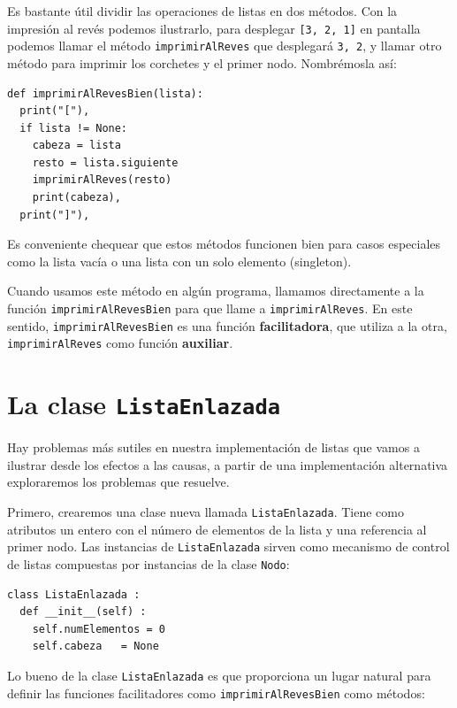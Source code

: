   
  

Es bastante útil dividir las operaciones de listas en dos métodos.
Con la impresión al revés podemos ilustrarlo, para desplegar \texttt{{[}3,
2, 1{]}} en pantalla podemos llamar el método \texttt{imprimirAlReves}
que desplegará \texttt{3, 2}, y llamar otro método para imprimir los
corchetes y el primer nodo. Nombrémosla así:

\beforeverb 
\begin{verbatim}
def imprimirAlRevesBien(lista):
  print("["),
  if lista != None:
    cabeza = lista
    resto = lista.siguiente
    imprimirAlReves(resto)
    print(cabeza),
  print("]"),
\end{verbatim}
\afterverb Es conveniente chequear que estos métodos funcionen bien
para casos especiales como la lista vacía o una lista con un solo
elemento (singleton).


Cuando usamos este método en algún programa, llamamos directamente
a la función \texttt{imprimirAlRevesBien} para que llame a \texttt{imprimirAlReves}.
En este sentido, \texttt{imprimirAlRevesBien} es una función \textbf{facilitadora},
que utiliza a la otra, \texttt{imprimirAlReves} como función \textbf{auxiliar}.

\section{La clase \texttt{ListaEnlazada}}

 

Hay problemas más sutiles en nuestra implementación de listas que
vamos a ilustrar desde los efectos a las causas, a partir de una implementación
alternativa exploraremos los problemas que resuelve.

Primero, crearemos una clase nueva llamada \texttt{ListaEnlazada}.
Tiene como atributos un entero con el número de elementos de la lista
y una referencia al primer nodo. Las instancias de \texttt{ListaEnlazada}
sirven como mecanismo de control de listas compuestas por instancias
de la clase \texttt{Nodo}:

\beforeverb 
\begin{verbatim}
class ListaEnlazada :
  def __init__(self) :
    self.numElementos = 0
    self.cabeza   = None
\end{verbatim}
\afterverb Lo bueno de la clase \texttt{ListaEnlazada} es que proporciona
un lugar natural para definir las funciones facilitadores como \texttt{imprimirAlRevesBien}
como métodos:

